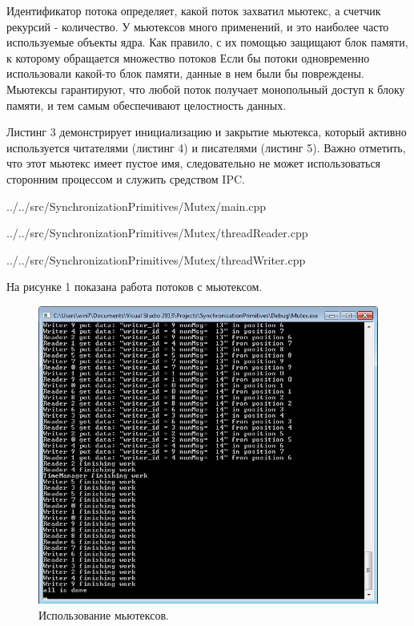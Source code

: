 \documentclass[a4paper, 12pt]{article}		%
\begin{document}
Идентификатор потока определяет, какой поток захватил мьютекс, а счетчик рекурсий - количество. У мьютексов много применений, и это наиболее часто используемые объекты ядра. Как правило, с их помощью защищают блок памяти, к которому обращается множество потоков Если бы потоки одновременно использовали какой-то блок памяти, данные в нем были бы повреждены. Мьютексы гарантируют, что любой поток получает монопольный доступ к блоку памяти, и тем самым обеспечивают целостность данных.

Листинг 3 демонстрирует инициализацию и закрытие мьютекса, который активно используется читателями (листинг 4) и писателями (листинг 5). Важно отметить, что этот мьютекс имеет пустое имя, следовательно не может использоваться сторонним процессом и служить средством IPC\cite{Dushutina}.


{../../src/SynchronizationPrimitives/Mutex/main.cpp}


{../../src/SynchronizationPrimitives/Mutex/threadReader.cpp}


{../../src/SynchronizationPrimitives/Mutex/threadWriter.cpp}

На рисунке 1 показана работа потоков с мьютексом.

\begin{figure}[h!]
\centering
\includegraphics[scale=1]{res/001}
\caption{Использование мьютексов.}
\end{figure}
\end{document}
